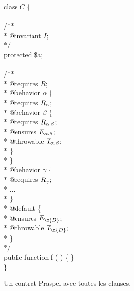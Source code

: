 \begin{figure}
\begin{pre}
class \(C\) \{ \\
\\
    /** \\
     * @invariant \(I\); \\
     */ \\
    protected \$a; \\
\\
    /** \\
     * @requires \(R\); \\
     * @behavior \(\alpha\) \{ \\
     *     @requires  \(R\sb{\alpha}\); \\
     *     @behavior \(\beta\) \{ \\
     *         @requires  \(R\sb{\alpha.\beta}\); \\
     *         @ensures   \(E\sb{\alpha.\beta}\); \\
     *         @throwable \(T\sb{\alpha.\beta}\); \\
     *     \} \\
     * \} \\
     * @behavior \(\gamma\) \{ \\
     *     @requires  \(R\sb{\gamma}\); \\
     *     \(\dots\) \\
     * \} \\
     * @default \{ \\
     *     @ensures   \(E\sb{\m{D}}\); \\
     *     @throwable \(T\sb{\m{D}}\); \\
     * \} \\
     */ \\
    public function f ( ) \{ \} \\
\}
\end{pre}

\caption{\label{figure:language:typical_contract} Un contrat Praspel avec toutes
les clauses.}

\end{figure}

